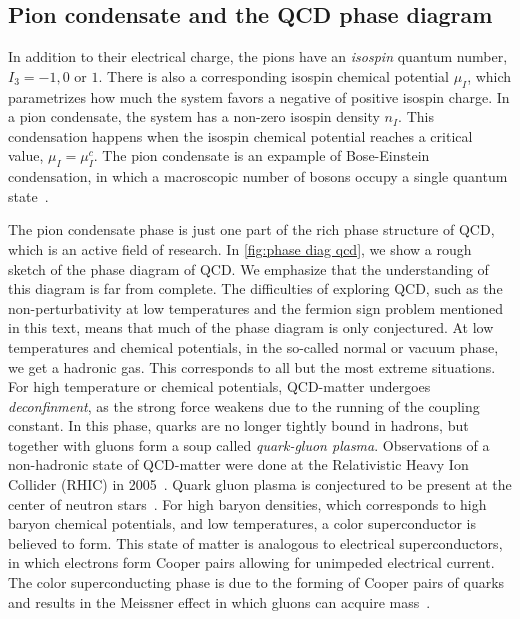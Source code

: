 \subsection*{Pion condensate and the QCD phase diagram}

In addition to their electrical charge, the pions have an \emph{isospin} quantum number, $I_3 = -1, 0$ or $1$.
There is also a corresponding isospin chemical potential $\mu_I$, which parametrizes how much the system favors a negative of positive isospin charge.
In a pion condensate, the system has a non-zero isospin density $n_I$.
This condensation happens when the isospin chemical potential reaches a critical value, $\mu_I = \mu_I^c$.
The pion condensate is an expample of Bose-Einstein condensation, in which a macroscopic number of bosons occupy a single quantum state~\cite{Brandt:QCD_phase_diagram_with_isospin_chemical_potential,Brandt:QCD_phase_diagram_for_nonzero_isospin-asymmetry}.

The pion condensate phase is just one part of the rich phase structure of QCD, which is an active field of research.
In \autoref{fig:phase diag qcd}, we show a rough sketch of the phase diagram of QCD.
We emphasize that the understanding of this diagram is far from complete.
The difficulties of exploring QCD, such as the non-perturbativity at low temperatures and the fermion sign problem mentioned in this text, means that much of the phase diagram is only conjectured.
At low temperatures and chemical potentials, in the so-called normal or vacuum phase, we get a hadronic gas.
This corresponds to all but the most extreme situations.
For high temperature or chemical potentials, QCD-matter undergoes \emph{deconfinment}, as the strong force weakens due to the running of the coupling constant.
In this phase, quarks are no longer tightly bound in hadrons, but together with gluons form a soup called \emph{quark-gluon plasma}.
Observations of a non-hadronic state of QCD-matter were done at the Relativistic Heavy Ion Collider (RHIC) in 2005~\cite{2005:RHIC,2005:RHIC2}.
Quark gluon plasma is conjectured to be present at the center of neutron stars~\cite{from_hadrons_to_quarks}.
For high baryon densities, which corresponds to high baryon chemical potentials, and low temperatures, a color superconductor is believed to form.
This state of matter is analogous to electrical superconductors, in which electrons form Cooper pairs allowing for unimpeded electrical current.
The color superconducting phase is due to the forming of Cooper pairs of quarks and results in the Meissner effect in which gluons can acquire mass~\cite{alford:color_superconductivity}.

